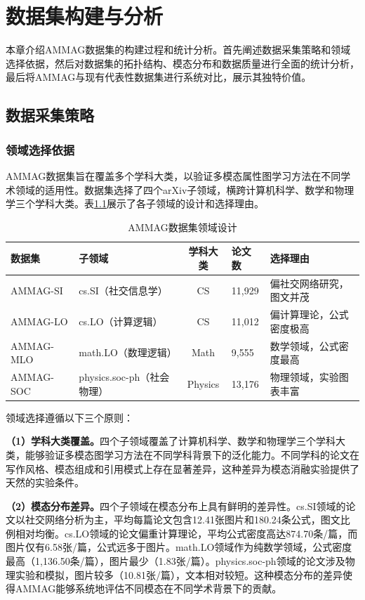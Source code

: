 
\chapter{数据集构建与分析}

本章介绍AMMAG数据集的构建过程和统计分析。首先阐述数据采集策略和领域选择依据，然后对数据集的拓扑结构、模态分布和数据质量进行全面的统计分析，最后将AMMAG与现有代表性数据集进行系统对比，展示其独特价值。

\section{数据采集策略}

\subsection{领域选择依据}

AMMAG数据集旨在覆盖多个学科大类，以验证多模态属性图学习方法在不同学术领域的适用性。数据集选择了四个arXiv子领域，横跨计算机科学、数学和物理学三个学科大类。表\ref{tab:domain_design}展示了各子领域的设计和选择理由。

\begin{table}[htbp]
  \centering
  \caption{AMMAG数据集领域设计}
  \label{tab:domain_design}
  \begin{tabular}{llclp{4.5cm}}
    \toprule
    数据集 & 子领域 & 学科大类 & 论文数 & 选择理由 \\
    \midrule
    AMMAG-SI & cs.SI（社交信息学） & CS & 11,929 & 偏社交网络研究，图文并茂 \\
    AMMAG-LO & cs.LO（计算逻辑） & CS & 11,012 & 偏计算理论，公式密度极高 \\
    AMMAG-MLO & math.LO（数理逻辑） & Math & 9,555 & 数学领域，公式密度最高 \\
    AMMAG-SOC & physics.soc-ph（社会物理） & Physics & 13,176 & 物理领域，实验图表丰富 \\
    \bottomrule
  \end{tabular}
\end{table}

领域选择遵循以下三个原则：

\textbf{（1）学科大类覆盖。}四个子领域覆盖了计算机科学、数学和物理学三个学科大类，能够验证多模态图学习方法在不同学科背景下的泛化能力。不同学科的论文在写作风格、模态组成和引用模式上存在显著差异，这种差异为模态消融实验提供了天然的实验条件。

\textbf{（2）模态分布差异。}四个子领域在模态分布上具有鲜明的差异性。cs.SI领域的论文以社交网络分析为主，平均每篇论文包含12.41张图片和180.24条公式，图文比例相对均衡。cs.LO领域的论文偏重计算理论，平均公式密度高达874.70条/篇，而图片仅有6.58张/篇，公式远多于图片。math.LO领域作为纯数学领域，公式密度最高（1,136.50条/篇），图片最少（1.83张/篇）。physics.soc-ph领域的论文涉及物理实验和模拟，图片较多（10.81张/篇），文本相对较短。这种模态分布的差异使得AMMAG能够系统地评估不同模态在不同学术背景下的贡献。

